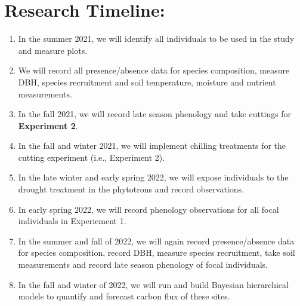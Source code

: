 \documentclass{article}\usepackage[]{graphicx}\usepackage[]{color}
\begin{document}
\section* {\textbf{Research Timeline:}}
  \begin{enumerate}
  \item In the summer 2021, we will identify all individuals to be used in the study and measure plots. 
  \item We will record all presence/absence data for species composition, measure DBH, species recruitment and soil temperature, moisture and nutrient measurements. 
  \item In the fall 2021, we will record late season phenology and take cuttings for \textbf{Experiment 2}. 
  \item In the fall and winter 2021, we will implement chilling treatments for the cutting experiment (i.e., Experiment 2). 
  \item In the late winter and early spring 2022, we will expose individuals to the drought treatment in the phytotrons and record observations. 
  \item In early spring 2022, we will record phenology observations for all focal individuals in Experiement 1.
  \item In the summer and fall of 2022, we will again record presence/absence data for species composition, record DBH, measure species recruitment, take soil measurements and record late season phenology of focal individuals. 
  \item In the fall and winter of 2022, we will run and build Bayesian hierarchical models to quantify and forecast carbon flux of these sites. 
  \end{enumerate}




\end{document}
